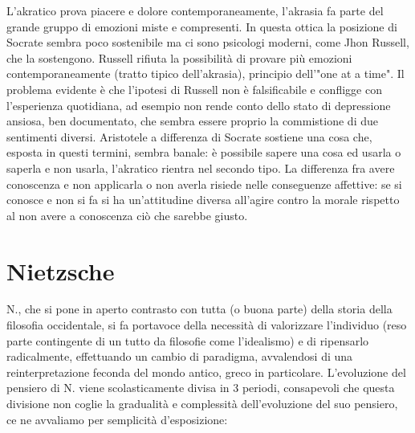 \documentclass[10pt,a4paper]{article}
\begin{document}
L'akratico prova piacere e dolore contemporaneamente, l'akrasia fa parte del grande gruppo di emozioni miste e compresenti. In questa ottica la posizione di Socrate sembra poco sostenibile ma ci sono psicologi moderni, come Jhon Russell, che la sostengono. Russell rifiuta la possibilità di provare più emozioni contemporaneamente (tratto tipico dell'akrasia), principio dell'"one at a time". Il problema evidente è che l'ipotesi di Russell non è falsificabile e confligge con l'esperienza quotidiana, ad esempio non rende conto dello stato di depressione ansiosa, ben documentato, che sembra essere proprio la commistione di due sentimenti diversi. Aristotele a differenza di Socrate sostiene una cosa che, esposta in questi termini, sembra banale: è possibile sapere una cosa ed usarla o saperla e non usarla, l'akratico rientra nel secondo tipo. La differenza fra avere conoscenza e non applicarla o non averla risiede nelle conseguenze affettive: se si conosce e non si fa si ha un'attitudine diversa all'agire contro la morale rispetto al non avere a conoscenza ciò che sarebbe giusto. 
\newpage
\section{Nietzsche}
N., che si pone in aperto contrasto con tutta (o buona parte) della storia della filosofia occidentale, si fa portavoce della necessità di valorizzare l'individuo (reso parte contingente di un tutto da filosofie come l'idealismo) e di ripensarlo radicalmente, effettuando un cambio di paradigma, avvalendosi di una reinterpretazione feconda del mondo antico, greco in particolare. L'evoluzione del pensiero di N. viene scolasticamente divisa in 3 periodi, consapevoli che questa divisione non coglie la gradualità e complessità dell'evoluzione del suo pensiero, ce ne avvaliamo per semplicità d'esposizione:
\end{document}
